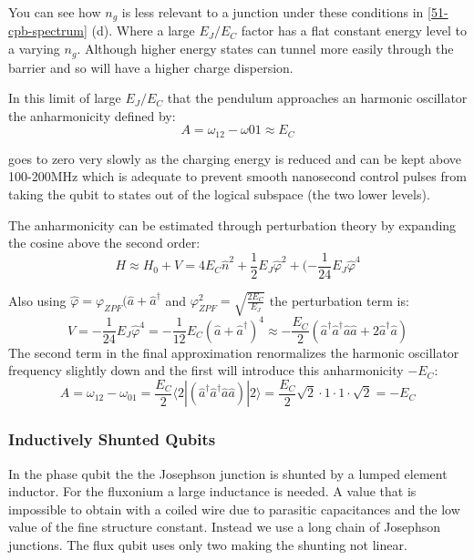\documentclass[12pt]{article}
\numberwithin{equation}{subsection}
\newcommand\ask[1]{
{%
}
}
\newcommand\page[1]{
{
}
}
\begin{document}
You can see how $n_g$ is less relevant to a junction under these conditions in \ref{51-cpb-spectrum} (d). Where a large $E_J/E_C$ factor has a flat constant energy level to a varying $n_g$. Although higher energy states can tunnel more easily through the barrier and so will have a higher charge dispersion.

\ask{Fiquei bem perdido nessa página em tudo depois da eq 4.27 do Girvin até antes da eq 4.31. Tem algo aqui que eu precise estudar a mais direitinho/colocar no relatório? Eu já pus as conclusões dessa parte no parágrafo anterior}
\page{54}
In this limit of large $E_J/E_C$ that the pendulum approaches an harmonic oscillator the anharmonicity defined by:
\begin{equation}
    A = \omega_{12}-\omega{01} \approx E_C
\end{equation}

goes to zero very slowly as the charging energy is reduced and can be kept above 100-200MHz which is adequate to prevent smooth nanosecond control pulses from taking the qubit to states out of the logical subspace (the two lower levels).

The anharmonicity can be estimated through perturbation theory by expanding the cosine above the second order:
\begin{equation}
   H \approx H_0+V = 4E_C\hat n^2 + \frac{1}{2} E_J \hat \varphi^2  + (-\frac{1}{24} E_J \hat \varphi ^4
\end{equation}

\page{55}
Also using $\hat \varphi = \varphi_{ZPF} (\hat a+ \hat a ^\dagger$ and $\varphi^2_{ZPF}= \sqrt{\frac{2E_C}{E_J}}$ the perturbation term is:
\begin{equation}
    V= -\frac{1}{24}E_J\hat \varphi^4 = -\frac{1}{12}E_C (\hat a + \hat a^\dagger)^4\approx - \frac{E_C}{2} (\hat a^\dagger\hat a^\dagger \hat a\hat a + 2 \hat a^\dagger \hat a)
\end{equation}
The second term in the final approximation renormalizes the harmonic oscillator frequency slightly down and the first will introduce this anharmonicity $-E_C$:
\begin{equation}
    A= \omega _{12} -\omega _{01} = \frac{E_C}{2} \langle 2| (\hat a^\dagger\hat a^\dagger \hat a\hat a)|2\rangle  =  \frac{E_C}{2} \sqrt{2} \cdot 1 \cdot 1 \cdot \sqrt 2 = -E_C
\end{equation}
\subsubsection{Inductively Shunted Qubits}
In the phase qubit the  the Josephson junction is shunted by a lumped element inductor. For the fluxonium a large inductance is needed. A value that is impossible to obtain with a coiled wire due to parasitic capacitances and the low value of the fine structure constant. Instead we use a long chain of Josephson junctions. The flux qubit uses only two making the shunting not linear.
\page{56}
\end{document}
